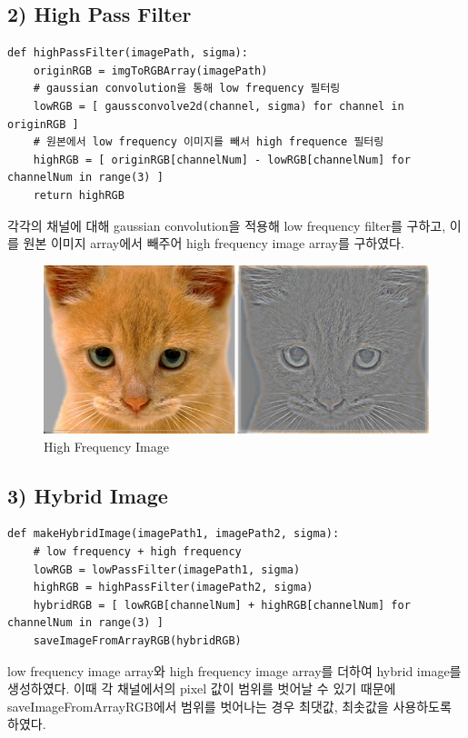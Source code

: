 \documentclass[]{report}
\begin{document}
\subsection*{2) High Pass Filter}

\begin{lstlisting}
def highPassFilter(imagePath, sigma):
	originRGB = imgToRGBArray(imagePath)
	# gaussian convolution을 통해 low frequency 필터링
	lowRGB = [ gaussconvolve2d(channel, sigma) for channel in originRGB ]
	# 원본에서 low frequency 이미지를 빼서 high frequence 필터링
	highRGB = [ originRGB[channelNum] - lowRGB[channelNum] for channelNum in range(3) ]
	return highRGB
\end{lstlisting}

각각의 채널에 대해 gaussian convolution을 적용해 low frequency filter를 구하고, 이를 원본 이미지 array에서 빼주어 high frequency image array를 구하였다. \\

\begin{figure}[ht!]
	\centering
	\includegraphics[width=1\textwidth]{image/highFrequencyCat.jpg}
	\caption{High Frequency Image}
	\label{highFrequencyCat}
\end{figure} 

\subsection*{3) Hybrid Image}

\begin{lstlisting}
def makeHybridImage(imagePath1, imagePath2, sigma):
	# low frequency + high frequency
	lowRGB = lowPassFilter(imagePath1, sigma)
	highRGB = highPassFilter(imagePath2, sigma)
	hybridRGB = [ lowRGB[channelNum] + highRGB[channelNum] for channelNum in range(3) ]
	saveImageFromArrayRGB(hybridRGB)
\end{lstlisting}

low frequency image array와 high frequency image array를 더하여 hybrid image를 생성하였다. 이때 각 채널에서의 pixel 값이 범위를 벗어날 수 있기 때문에 saveImageFromArrayRGB에서 범위를 벗어나는 경우 최댓값, 최솟값을 사용하도록 하였다. \\
\end{document}
